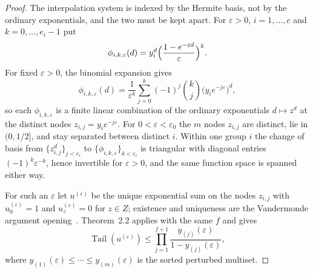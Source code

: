 \documentclass[11pt]{article}
\theoremstyle{definition}
\theoremstyle{plain}
\DeclareMathOperator{\Tail}{Tail}
\begin{document}
\begin{proof}
The interpolation system is indexed by the Hermite basis, not by the
ordinary exponentials, and the two must be kept apart.  For
$\varepsilon>0$, $i=1,\ldots,c$ and $k=0,\ldots,e_i-1$ put
\[
  \phi_{i,k,\varepsilon}(d)
  =y_i^d\Bigl(\frac{1-e^{-\varepsilon d}}{\varepsilon}\Bigr)^k .
\]
For fixed $\varepsilon>0$, the binomial expansion gives
\[
  \phi_{i,k,\varepsilon}(d)
  =\frac1{\varepsilon^k}\sum_{j=0}^{k}(-1)^j\binom{k}{j}
    \bigl(y_ie^{-j\varepsilon}\bigr)^d,
\]
so each $\phi_{i,k,\varepsilon}$ is a finite linear combination of the
ordinary exponentials $d\mapsto z^d$ at the distinct nodes
$z_{i,j}=y_ie^{-j\varepsilon}$.  For $0<\varepsilon<\varepsilon_0$ the $m$
nodes $z_{i,j}$ are distinct, lie in $(0,1/2]$, and stay separated between
distinct $i$.  Within one group $i$ the change of basis from
$\{z_{i,j}^{d}\}_{j<e_i}$ to
$\{\phi_{i,k,\varepsilon}\}_{k<e_i}$ is triangular with diagonal entries
$(-1)^k\varepsilon^{-k}$, hence invertible for $\varepsilon>0$, and the same
function space is spanned either way.

For such an $\varepsilon$ let $u^{(\varepsilon)}$ be the unique exponential
sum on the nodes $z_{i,j}$ with $u^{(\varepsilon)}_0=1$ and
$u^{(\varepsilon)}_z=0$ for $z\in Z$; existence and uniqueness are the
Vandermonde argument opening~\cite[Section~2]{coefficient-mass}.
Theorem~2.2 applies with the same $f$ and gives
\[
  \Tail(u^{(\varepsilon)})
  \le\prod_{j=1}^{f+1}\frac{y_{(j)}(\varepsilon)}{1-y_{(j)}(\varepsilon)},
\]
where $y_{(1)}(\varepsilon)\le\cdots\le y_{(m)}(\varepsilon)$ is the sorted
perturbed multiset.


\end{proof}
\end{document}
